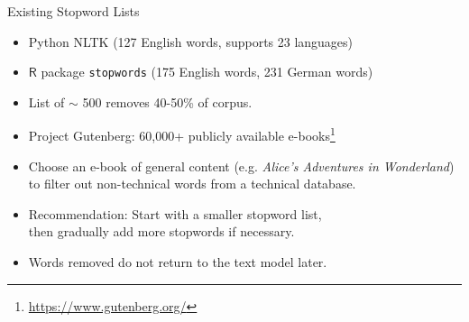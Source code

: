 \documentclass{beamer}
\renewcommand{\cite}{\citep}
\begin{document}

\begin{frame}{Existing Stopword Lists}
\begin{itemize}
\item Python NLTK (127 English words, supports 23 languages)
\item $\mathsf{R}$ package \texttt{stopwords} (175 English words, 231 German words)
\item List of $\sim$ 500 removes 40-50\% of corpus.~\cite{schofield2017pulling}
	\bigskip
\item Project Gutenberg: 60,000+ publicly available e-books\footnote{\url{https://www.gutenberg.org/}}
\item Choose an e-book of general content (e.g. \textit{Alice's Adventures in Wonderland}) to filter out non-technical words from a technical database.~\cite{brooke2015gutentag}
	\bigskip
\item Recommendation: Start with a smaller stopword list,\\
	then gradually add more stopwords if necessary.
\item Words removed do not return to the text model later.
\end{itemize}
\end{frame}



\end{document}
